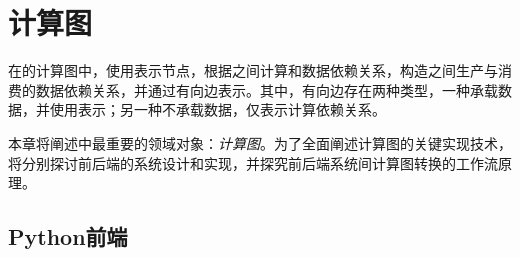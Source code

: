 \begin{savequote}[45mm]
\end{savequote}

\chapter{计算图} 
\label{ch:computation-graph}

\begin{content}

在\tf{}的计算图中，使用表示节点，根据之间计算和数据依赖关系，构造之间生产与消费的数据依赖关系，并通过有向边表示。其中，有向边存在两种类型，一种承载数据，并使用表示；另一种不承载数据，仅表示计算依赖关系。

本章将阐述\tf{}中最重要的领域对象：\emph{计算图}。为了全面阐述计算图的关键实现技术，将分别探讨前后端的系统设计和实现，并探究前后端系统间计算图转换的工作流原理。

\end{content}

\section{Python前端}

